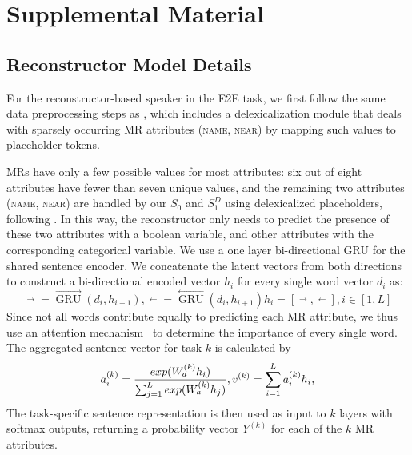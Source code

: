 \documentclass[11pt,a4paper]{article}
\newcommand{\basespk}[0]{$S_0$\xspace}
\newcommand{\pragd}[0]{$S_1^D$\xspace}
\begin{document}



\appendix



\clearpage


\section{Supplemental Material}
\label{sec:supplemental}
\subsection{Reconstructor Model Details}
\label{sec:appendix_reconstructor}
 For the reconstructor-based speaker in the E2E task, we first follow the same data preprocessing steps as \citet{puzikov2018e2e}, which includes a delexicalization module that deals with sparsely occurring MR attributes (\textsc{name}, \textsc{near}) by mapping such values to placeholder tokens.
 
MRs have only a few possible values for most attributes: six out of eight attributes have fewer than seven unique values, and the remaining two attributes (\textsc{name}, \textsc{near}) are handled by our \basespk and \pragd using delexicalized placeholders, following \citet{puzikov2018e2e}.
In this way, the reconstructor only needs to predict the presence of these two attributes with a boolean variable, and other attributes with the corresponding categorical variable. We use a one layer bi-directional GRU \cite{cho2014gru} for the shared sentence encoder. We concatenate the latent vectors from both directions to construct a bi-directional encoded vector $h_i$ for every single word vector $d_i$ as:
\begin{subequations}
\begin{equation*}
\mathop{h_i}\limits ^{\rightarrow}=\mathop{GRU}\limits ^{\longrightarrow}(d_i, h_{i-1}), 
\mathop{h_i}\limits ^{\leftarrow}=\mathop{GRU}\limits ^{\longleftarrow}(d_i, h_{i+1})
\end{equation*}
\begin{equation*}
h_i = [\mathop{h_i}\limits ^{\rightarrow}, \mathop{h_i}\limits ^{\leftarrow}], i \in [1,L]
\end{equation*}	
\end{subequations}
Since not all words contribute equally to predicting each MR attribute, we thus use an attention mechanism~\cite{bahdanau2014neural} to determine the importance of every single word. The aggregated sentence vector for task $k$ is calculated by
\begin{equation*}
a_i^{(k)} = \frac{exp(W_a^{(k)}h_i)}{\sum_{j=1}^Lexp(W_a^{(k)}h_j)}, \\
v^{(k)}=\sum_{i=1}^La_i^{(k)}h_i,
\end{equation*}
The task-specific sentence representation is then used as input to $k$ layers with softmax outputs, returning a probability vector $Y^{(k)}$ for each of the $k$ MR attributes. 
\end{document}
